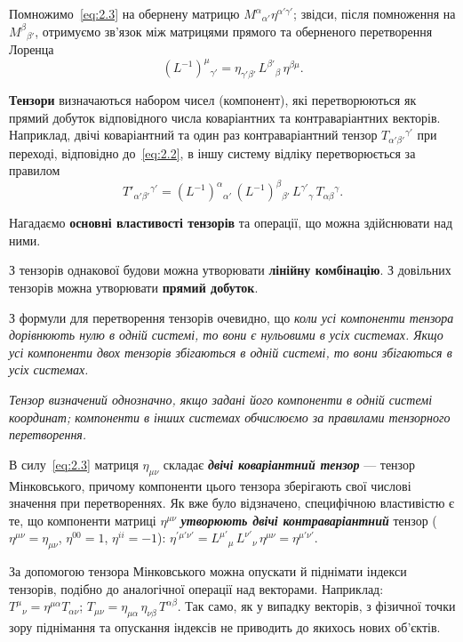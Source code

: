 \documentclass[%
biblatex,
]{ConspectBook}
\begin{document}
Помножимо~\eqref{eq:2.3} на обернену матрицю
$M^\alpha{}_{\alpha'} \eta^{\alpha'\gamma'}$;
звідси, після помноження на $M^\beta{}_{\beta'}$,
отримуємо зв'язок між матрицями прямого та оберненого перетворення Лоренца
\begin{equation}
  (L^{-1})^\mu{}_{\gamma'} = \eta_{\gamma'\beta'}\, L^{\beta'}{}_\beta\, \eta^{\beta\mu}.
  \label{eq:2.4}
\end{equation}

\textbf{Тензори} визначаються набором чисел (компонент), які перетворюються
як прямий добуток відповідного числа коваріантних та контраваріантних
векторів. Наприклад, двічі коваріантний та один раз контраваріантний тензор
$T_{\alpha'\beta'}{}^{\gamma'}$ при переході, відповідно до~\eqref{eq:2.2},
в іншу систему відліку перетворюється за правилом
\[
  T'_{\alpha'\beta'}{}^{\gamma'} =
  (L^{-1})^\alpha{}_{\alpha'}\,(L^{-1})^\beta{}_{\beta'}\,
  L^{\gamma'}{}_\gamma\, T_{\alpha\beta}{}^\gamma.
\]

Нагадаємо \textbf{основні властивості тензорів} та операції, що можна
здійснювати над ними.

З тензорів однакової будови можна утворювати \textbf{лінійну комбінацію}.
З довільних тензорів можна утворювати \textbf{прямий добуток}.

З формули для перетворення тензорів очевидно, що \textit{коли усі
компоненти тензора дорівнюють нулю в одній системі, то вони є нульовими
в усіх системах. Якщо усі компоненти двох тензорів збігаються в одній
системі, то вони збігаються в усіх системах.}

\textit{Тензор визначений однозначно, якщо задані його компоненти в одній
системі координат; компоненти в інших системах обчислюємо за правилами
тензорного перетворення.}

В силу~\eqref{eq:2.3} матриця $\eta_{\mu\nu}$ складає
\textit{\textbf{двічі коваріантний тензор}} --- тензор Мінковського,
причому компоненти цього тензора зберігають свої числові значення при
перетвореннях. Як вже було відзначено, специфічною властивістю є те, що
компоненти матриці $\eta^{\mu\nu}$ \textbf{\textit{утворюють двічі
контраваріантний}} тензор ($\eta^{\mu\nu} = \eta_{\mu\nu}$,
$\eta^{00}=1$, $\eta^{ii}=-1$):
$\eta^{\prime\mu'\nu'} = L^{\mu'}{}_\mu\, L^{\nu'}{}_\nu\, \eta^{\mu\nu} = \eta^{\mu'\nu'}$.

За допомогою тензора Мінковського можна опускати й піднімати індекси
тензорів, подібно до аналогічної операції над векторами. Наприклад:
$T^\mu{}_\nu = \eta^{\mu\alpha} T_{\alpha\nu}$;
$T_{\mu\nu} = \eta_{\mu\alpha}\, \eta_{\nu\beta}\, T^{\alpha\beta}$.
Так само, як у випадку векторів, з фізичної точки зору піднімання та
опускання індексів не приводить до якихось нових об'єктів.
\end{document}
